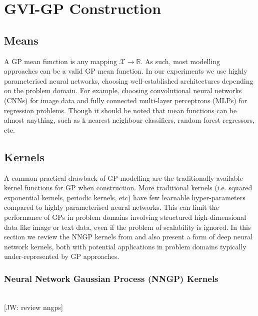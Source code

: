 \documentclass{article}
\newcommand{\jw}[1]{{\color{gray} [JW: #1]}}
\numberwithin{equation}{section}
\begin{document}
\newpage
\section{GVI-GP Construction}\label{section:gvi-gp-construction}
\subsection{Means}
A GP mean function is any mapping $\mathcal{X} \rightarrow \mathbb{R}$. As such, most modelling approaches can be a valid GP mean function. In our experiments we use highly parameterised neural networks, choosing well-established architectures depending on the problem domain. For example, choosing convolutional neural networks (CNNs) for image data and fully connected multi-layer perceptrons (MLPs) for regression problems. Though it should be noted that mean functions can be almost anything, such as k-nearest neighbour classifiers, random forest regressors, etc.

\subsection{Kernels}\label{section:kernels}
A common practical drawback of GP modelling are the traditionally available kernel functions for GP when construction. More traditional kernels (i.e. squared exponential kernels, periodic kernels, etc) have few learnable hyper-parameters compared to highly parameterised neural networks. This can limit the performance of GPs in problem domains involving structured high-dimensional data like image or text data, even if the problem of scalability is ignored. In this section we review the NNGP kernels from \cite{novak2019neural} and also present a form of deep neural network kernels, both with potential applications in problem domains typically under-represented by GP approaches.

\subsubsection{Neural Network Gaussian Process (NNGP) Kernels}
\\\jw{review nngps}
\end{document}
